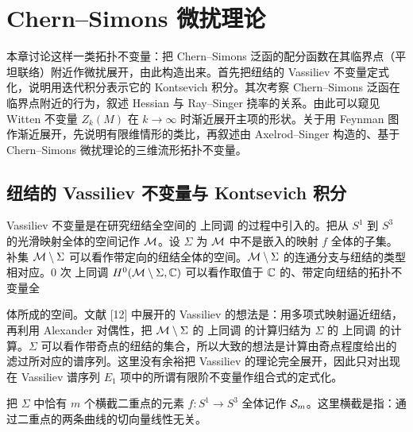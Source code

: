 
\chapter{Chern--Simons 微扰理论}

本章讨论这样一类拓扑不变量：把 Chern--Simons 泛函的配分函数在其临界点（平坦联络）附近作微扰展开，由此构造出来。首先把纽结的 Vassiliev 不变量定式化，说明用迭代积分表示它的 Kontsevich 积分。其次考察 Chern--Simons 泛函在临界点附近的行为，叙述 Hessian 与 Ray--Singer 挠率的关系。由此可以窥见 Witten 不变量 $Z_k(M)$ 在 $k\to\infty$ 时渐近展开主项的形状。关于用 Feynman 图作渐近展开，先说明有限维情形的类比，再叙述由 Axelrod--Singer 构造的、基于 Chern--Simons 微扰理论的三维流形拓扑不变量。

\section{纽结的 Vassiliev 不变量与 Kontsevich 积分}


Vassiliev 不变量是在研究纽结全空间的 上同调 的过程中引入的。把从 $S^{1}$ 到 $S^{3}$ 的光滑映射全体的空间记作 $\mathcal{M}$。设 $\Sigma$ 为 $\mathcal{M}$ 中不是嵌入的映射 $f$ 全体的子集。补集 $\mathcal{M}\setminus\Sigma$ 可以看作带定向的纽结全体的空间。$\mathcal{M}\setminus\Sigma$ 的连通分支与纽结的类型相对应。0 次 上同调 $H^{0}(\mathcal{M}\setminus\Sigma,\mathbb{C})$ 可以看作取值于 $\mathbb{C}$ 的、带定向纽结的拓扑不变量全

体所成的空间。文献 [12] 中展开的 Vassiliev 的想法是：用多项式映射逼近纽结，再利用 Alexander 对偶性，把 $\mathcal{M}\setminus\Sigma$ 的 上同调 的计算归结为 $\Sigma$ 的 上同调 的计算。$\Sigma$ 可以看作带奇点的纽结的集合，所以大致的想法是计算由奇点程度给出的滤过所对应的谱序列。这里没有余裕把 Vassiliev 的理论完全展开，因此只对出现在 Vassiliev 谱序列 $E_{1}$ 项中的所谓有限阶不变量作组合式的定式化。

把 $\Sigma$ 中恰有 $m$ 个横截二重点的元素 $f\colon S^{1}\to S^{3}$ 全体记作 $\mathcal{S}_m$。这里横截是指：通过二重点的两条曲线的切向量线性无关。

